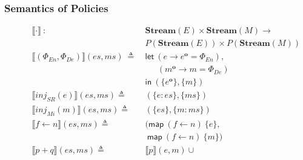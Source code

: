 \documentclass[sigconf,usenames,dvipsnames,svgnames,table]{acmart}
\newcommand{\interp}[1]{\llbracket #1 \rrbracket}
\newcommand{\obf}[1]{#1^\mathbf{o}}
\begin{document}

      \subsubsection{Semantics of Policies}\label{sec:spec:sem:pol}
        \begin{figure}
          \centering
          { %
          \begin{align*}
            \interp { \cdot }\ 
              :\ \ &
              \mathbf{Stream}(E)\times \mathbf{Stream}(M) \rightarrow \\
              & P(\mathbf{Stream}(E))\times P(\mathbf{Stream}(M)) 
              \\\hline
            \interp {(\Phi_{En}, \Phi_{De})}(es, ms)\
              \triangleq\
              & \mathsf{let}\ (e \rightarrow \obf{e} = \Phi_{En}),\\
              & \quad\ \      (\obf{m} \rightarrow m = \Phi_{De}) \\
              & \mathsf{in}\
              (\{\obf{e}\}, \{m\})
              \\
            \interp { inj_{SR}(e) }(es, ms)
              \triangleq\ &
              (\{e : es\}, \{ms\}) 
              \\
            \interp { inj_{Mi}(m) }(es, ms)
              \triangleq\ &
              (\{es\},\{m : ms\})
              \\
            \interp { f \leftarrow n }(es, ms)
              \triangleq\ 
              & (\mathsf{map}\ (f\leftarrow n)\ \{e\},\\
              &\ \mathsf{map}\ (f\leftarrow n)\ \{m\})
              \\ %
            \interp { p + q }(es, ms)
              \triangleq\ &
              \interp { p }(e, m)\cup

\end{align*}}
\end{figure}
\end{document}
